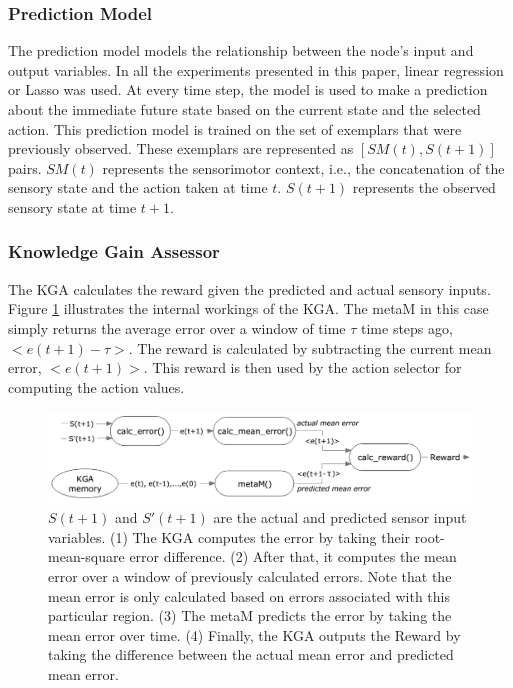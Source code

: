 \FloatBarrier
\subsubsection{Prediction Model}

The prediction model models the relationship between the node's input and output variables. In all the experiments presented in this paper, linear regression or Lasso was used. At every time step, the model is used to make a prediction about the immediate future state based on the current state and the selected action. This prediction model is trained on the set of exemplars that were previously observed. These exemplars are represented as $[SM(t),S(t+1)]$ pairs. $SM(t)$ represents the sensorimotor context, i.e., the concatenation of the sensory state and the action taken at time $t$. $S(t+1)$ represents the observed sensory state at time $t+1$. 

\subsubsection{Knowledge Gain Assessor}

The KGA calculates the reward given the predicted and actual sensory inputs. Figure \ref{fig:Block Diagram KGA} illustrates the internal workings of the KGA. The metaM in this case simply returns the average error over a window of time $\tau$ time steps ago, $<e(t+1)-\tau>$. The reward is calculated by subtracting the current mean error, $<e(t+1)>$. This reward is then used by the action selector for computing the action values. 

\begin{figure}[htbp]
	\centering
	\includegraphics[width=1.0 \textwidth]{"fig/cbla/Block Diagram KGA"}
	\caption[Block diagram of the Knowledge Gain Assessor]{$S(t+1)$ and $S'(t+1)$ are the actual and predicted sensor input variables. (1) The KGA computes the error by taking their root-mean-square error difference. (2) After that, it computes the mean error over a window of previously calculated errors. Note that the mean error is only calculated based on errors associated with this particular region. (3) The metaM predicts the error by taking the mean error over time. (4) Finally, the KGA outputs the Reward by taking the difference between the actual mean error and predicted mean error. }
	\label{fig:Block Diagram KGA}
\end{figure}

